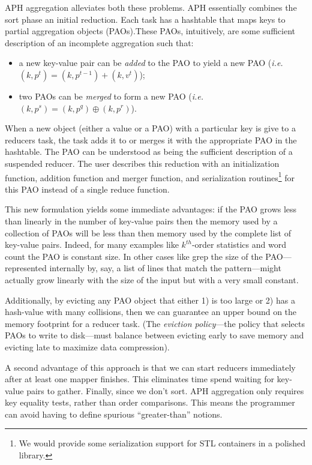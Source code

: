 \documentclass[10pt,letter,final,article,twocolumn]{article} %
\begin{document}
 APH aggregation alleviates both these problems. APH essentially combines the sort phase an initial reduction. Each task has a hashtable that maps keys to partial aggregation objects (PAOs).These PAOs, intuitively, are some sufficient description of an incomplete aggregation such that:
\begin{itemize}
 \item a new key-value pair can be \emph{added} to the PAO to yield a new PAO (\emph{i.e.} $(k,p^t) = (k,p^{t-1}) + (k,v^t)$);
 \item two PAOs can be \emph{merged} to form a new PAO (\emph{i.e.} $(k,p^s) = (k,p^q) \oplus (k,p^r)$).
\end{itemize}
When a new object (either a value or a PAO) with a particular key is give to a reducers task, the task adds it to or merges it with the appropriate PAO in the hashtable. The PAO can be understood as being the sufficient description of a suspended reducer. The user describes this reduction with an initialization function, addition function and merger function, and serialization routines\footnote{We would provide some serialization support for STL containers in a polished library.} for this PAO instead of a single reduce function.

This new formulation yields some immediate advantages: if the PAO grows less than linearly in the number of key-value pairs then the memory used by a collection of PAOs will be less than then memory used by the complete list of key-value pairs. Indeed, for many examples like $k^{th}$-order statistics and word count the PAO is constant size. In other cases like grep the size of the PAO---represented internally by, say, a list of lines that match the pattern---might actually grow linearly with the size of the input but with a very small constant.

Additionally, by evicting any PAO object that either 1) is too large or 2) has a hash-value with many collisions, then we can guarantee an upper bound on the memory footprint for a reducer task. (The \emph{eviction policy}---the policy that selects PAOs to write to disk---must balance between evicting early to save memory and evicting late to maximize data compression).  

A second advantage of this approach is that we can start reducers immediately after at least one mapper finishes. This eliminates time spend waiting for key-value pairs to gather. Finally, since we don't sort. APH aggregation only requires key equality tests, rather than order comparisons. This means the programmer can avoid having to define spurious ``greater-than'' notions.
\end{document}
